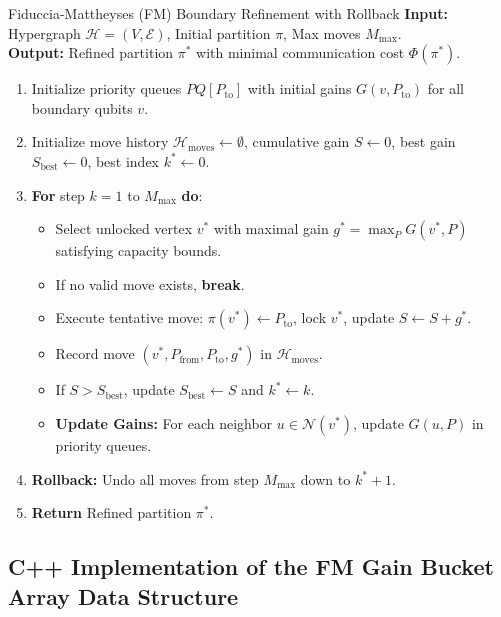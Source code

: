 \begin{algorithmbox}{Fiduccia-Mattheyses (FM) Boundary Refinement with Rollback}
\textbf{Input:} Hypergraph $\mathcal{H} = (V, \mathcal{E})$, Initial partition $\pi$, Max moves $M_{\max}$.\\
\textbf{Output:} Refined partition $\pi^*$ with minimal communication cost $\Phi(\pi^*)$.

\begin{enumerate}[leftmargin=1.5em]
    \item Initialize priority queues $PQ[P_{\text{to}}]$ with initial gains $G(v, P_{\text{to}})$ for all boundary qubits $v$.
    \item Initialize move history $\mathcal{H}_{\text{moves}} \leftarrow \emptyset$, cumulative gain $S \leftarrow 0$, best gain $S_{\text{best}} \leftarrow 0$, best index $k^* \leftarrow 0$.
    \item \textbf{For} step $k = 1$ to $M_{\max}$ \textbf{do}:
    \begin{itemize}
        \item Select unlocked vertex $v^*$ with maximal gain $g^* = \max_{P} G(v^*, P)$ satisfying capacity bounds.
        \item If no valid move exists, \textbf{break}.
        \item Execute tentative move: $\pi(v^*) \leftarrow P_{\text{to}}$, lock $v^*$, update $S \leftarrow S + g^*$.
        \item Record move $(v^*, P_{\text{from}}, P_{\text{to}}, g^*)$ in $\mathcal{H}_{\text{moves}}$.
        \item If $S > S_{\text{best}}$, update $S_{\text{best}} \leftarrow S$ and $k^* \leftarrow k$.
        \item \textbf{Update Gains:} For each neighbor $u \in \mathcal{N}(v^*)$, update $G(u, P)$ in priority queues.
    \end{itemize}
    \item \textbf{Rollback:} Undo all moves from step $M_{\max}$ down to $k^* + 1$.
    \item \textbf{Return} Refined partition $\pi^*$.
\end{enumerate}
\end{algorithmbox}

\subsection{C++ Implementation of the FM Gain Bucket Array Data Structure}
\label{sec:cpp_bucket_array}

